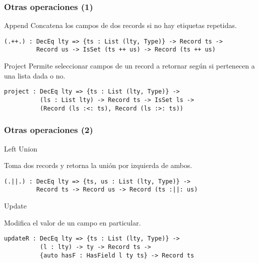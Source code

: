 \documentclass{beamer}
\begin{document}
\begin{frame}[fragile]
\frametitle{Otras operaciones (1)}

\begin{block}{Append}
Concatena los campos de dos records si no hay etiquetas repetidas.

\begin{definition}
\begin{verbatim}
(.++.) : DecEq lty => {ts : List (lty, Type)} -> Record ts -> 
         Record us -> IsSet (ts ++ us) -> Record (ts ++ us)
\end{verbatim}
\end{definition}

\end{block}

\begin{block}{Project}
Permite seleccionar campos de un record a retornar según si pertenecen a una lista dada o no.

\begin{definition}
\begin{verbatim}
project : DecEq lty => {ts : List (lty, Type)} -> 
          (ls : List lty) -> Record ts -> IsSet ls -> 
          (Record (ls :<: ts), Record (ls :>: ts))
\end{verbatim}
\end{definition}

\end{block}

\end{frame}


\begin{frame}[fragile]
\frametitle{Otras operaciones (2)}

\begin{block}{Left Union}

Toma dos records y retorna la unión por izquierda de ambos.

\begin{definition}
\begin{verbatim}
(.||.) : DecEq lty => {ts, us : List (lty, Type)} -> 
         Record ts -> Record us -> Record (ts :||: us)
\end{verbatim}
\end{definition}

\end{block}

\begin{block}{Update}

Modifica el valor de un campo en particular.

\begin{definition}
\begin{verbatim}
updateR : DecEq lty => {ts : List (lty, Type)} -> 
          (l : lty) -> ty -> Record ts -> 
          {auto hasF : HasField l ty ts} -> Record ts
\end{verbatim}
\end{definition}

\end{block}
\end{frame}
\end{document}
